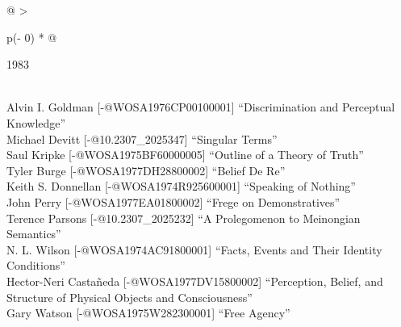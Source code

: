 \documentclass[
  10pt,
  letterpaper,
  DIV=11,
  numbers=noendperiod,
  twoside]{scrartcl}
\begin{document}
\begin{longtable}[]{@{}
  >{\raggedright\arraybackslash}p{(\columnwidth - 0\tabcolsep) * }@{}}

\caption{\label{tbl-top-ten-1974}Most cited articles published less than
ten years ago as of 1983.}

\tabularnewline

\toprule\noalign{}
\begin{minipage}[b]{\linewidth}\raggedright
1983
\end{minipage} \\
\midrule\noalign{}
\endhead
\bottomrule\noalign{}
\endlastfoot
Alvin I. Goldman {[}-@WOSA1976CP00100001{]} ``Discrimination and
Perceptual Knowledge'' \\
Michael Devitt {[}-@10.2307\_2025347{]} ``Singular Terms'' \\
Saul Kripke {[}-@WOSA1975BF60000005{]} ``Outline of a Theory of
Truth'' \\
Tyler Burge {[}-@WOSA1977DH28800002{]} ``Belief De Re'' \\
Keith S. Donnellan {[}-@WOSA1974R925600001{]} ``Speaking of Nothing'' \\
John Perry {[}-@WOSA1977EA01800002{]} ``Frege on Demonstratives'' \\
Terence Parsons {[}-@10.2307\_2025232{]} ``A Prolegomenon to Meinongian
Semantics'' \\
N. L. Wilson {[}-@WOSA1974AC91800001{]} ``Facts, Events and Their
Identity Conditions'' \\
Hector-Neri Castañeda {[}-@WOSA1977DV15800002{]} ``Perception, Belief,
and Structure of Physical Objects and Consciousness'' \\
Gary Watson {[}-@WOSA1975W282300001{]} ``Free Agency'' \\

\end{longtable}
\end{document}
